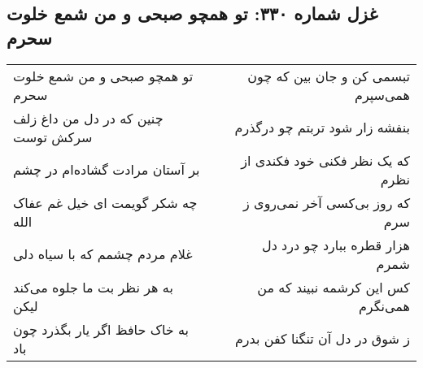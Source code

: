 \begin{center}
\section*{غزل شماره ۳۳۰: تو همچو صبحی و من شمع خلوت سحرم}
\label{sec:sh330}
\begin{longtable}{l p{0.5cm} r}
تو همچو صبحی و من شمع خلوت سحرم
&&
تبسمی کن و جان بین که چون همی‌سپرم
\\
چنین که در دل من داغ زلف سرکش توست
&&
بنفشه زار شود تربتم چو درگذرم
\\
بر آستان مرادت گشاده‌ام در چشم
&&
که یک نظر فکنی خود فکندی از نظرم
\\
چه شکر گویمت ای خیل غم عفاک الله
&&
که روز بی‌کسی آخر نمی‌روی ز سرم
\\
غلام مردم چشمم که با سیاه دلی
&&
هزار قطره ببارد چو درد دل شمرم
\\
به هر نظر بت ما جلوه می‌کند لیکن
&&
کس این کرشمه نبیند که من همی‌نگرم
\\
به خاک حافظ اگر یار بگذرد چون باد
&&
ز شوق در دل آن تنگنا کفن بدرم
\\
\end{longtable}
\end{center}
